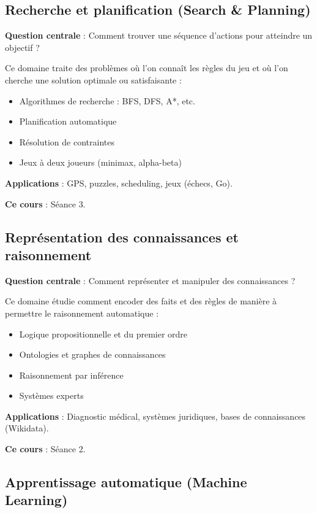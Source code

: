 \documentclass[11pt,a4paper]{article}
\begin{document}
\subsection{Recherche et planification (Search \& Planning)}

\textbf{Question centrale} : Comment trouver une séquence d'actions pour atteindre un objectif ?

Ce domaine traite des problèmes où l'on connaît les règles du jeu et où l'on cherche une solution optimale ou satisfaisante :
\begin{itemize}
    \item Algorithmes de recherche : BFS, DFS, A*, etc.
    \item Planification automatique
    \item Résolution de contraintes
    \item Jeux à deux joueurs (minimax, alpha-beta)
\end{itemize}

\textbf{Applications} : GPS, puzzles, scheduling, jeux (échecs, Go).

\textbf{Ce cours} : Séance 3.

\subsection{Représentation des connaissances et raisonnement}

\textbf{Question centrale} : Comment représenter et manipuler des connaissances ?

Ce domaine étudie comment encoder des faits et des règles de manière à permettre le raisonnement automatique :
\begin{itemize}
    \item Logique propositionnelle et du premier ordre
    \item Ontologies et graphes de connaissances
    \item Raisonnement par inférence
    \item Systèmes experts
\end{itemize}

\textbf{Applications} : Diagnostic médical, systèmes juridiques, bases de connaissances (Wikidata).

\textbf{Ce cours} : Séance 2.

\subsection{Apprentissage automatique (Machine Learning)}
\end{document}
